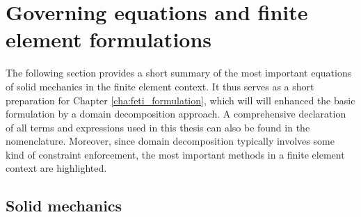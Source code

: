 
\chapter{Governing equations and finite element formulations}\label{cha:governing_equations}
The following section provides a short summary of the most important equations of solid mechanics in the finite element context. It thus serves as a short preparation for Chapter \ref{cha:feti_formulation}, which will will enhanced the basic formulation by a domain decomposition approach. A comprehensive declaration of all terms and expressions used in this thesis can also be found in the nomenclature. Moreover, since domain decomposition typically involves some kind of constraint enforcement, the most important methods in a finite element context are highlighted.
\section{Solid mechanics}\label{sec:solid_mechanics}


